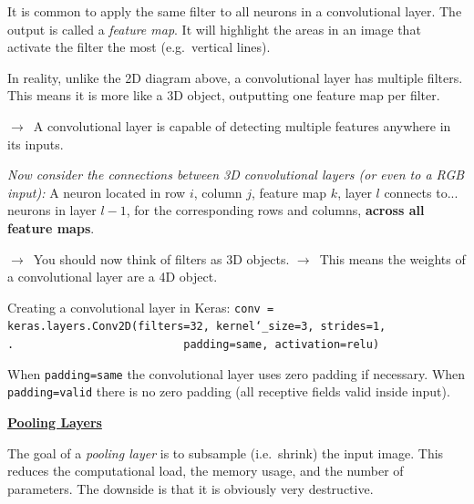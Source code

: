 It is common to apply the same filter to all neurons in a convolutional layer.\newline
The output is called a \textit{feature map}.\newline
It will highlight the areas in an image that activate the filter the most (e.g.~vertical lines).

In reality,
unlike the 2D diagram above,
a convolutional layer has multiple filters.\newline
This means it is more like a 3D object,
outputting one feature map per filter.

$\rightarrow$~A convolutional layer is capable of detecting multiple features
anywhere in its inputs.

\textit{Now consider the connections between 3D convolutional layers (or even to a RGB input):}\newline
A neuron located in row $i$, column $j$, feature map $k$, layer $l$ connects to...\newline
neurons in layer $l-1$, for the corresponding rows and columns, \textbf{across all feature maps}.

$\rightarrow$~You should now think of filters as 3D objects.\newline
$\rightarrow$~This means the weights of a convolutional layer are a 4D object.

Creating a convolutional layer in Keras:\newline
\texttt{conv = keras.layers.Conv2D(filters=32, kernel\char`_size=3, strides=1,\newline
.~~~~~~~~~~~~~~~~~~~~~~~~~~padding=\textquotesingle same\textquotesingle, activation=\textquotesingle relu\textquotesingle)}

When \texttt{padding=\textquotesingle same\textquotesingle}
the convolutional layer uses zero padding if necessary.\newline
When \texttt{padding=\textquotesingle valid\textquotesingle}
there is no zero padding (all receptive fields valid inside input).\newline\newline

\textbf{\underline{Pooling Layers}}

The goal of a \textit{pooling layer} is to subsample (i.e.~shrink) the input image.\newline
This reduces the computational load, the memory usage, and the number of parameters.\newline
The downside is that it is obviously very destructive.

